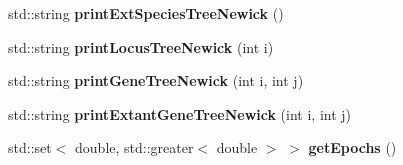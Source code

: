 \begin{DoxyCompactItemize}
std\+::string {\bfseries print\+Ext\+Species\+Tree\+Newick} ()
\item 
\mbox{\label{class_simulator_a97a59d13372af9e44e5a77ffb52f691f}} 
std\+::string {\bfseries print\+Locus\+Tree\+Newick} (int i)
\item 
\mbox{\label{class_simulator_a66f898c3509caa6fed6f2541b6f5e18d}} 
std\+::string {\bfseries print\+Gene\+Tree\+Newick} (int i, int j)
\item 
\mbox{\label{class_simulator_a2fec1961177cc3fc467c32758985c2b5}} 
std\+::string {\bfseries print\+Extant\+Gene\+Tree\+Newick} (int i, int j)
\item 
\mbox{\label{class_simulator_ad9fea6b4be6b5f88108b2ad84a016074}} 
std\+::set$<$ double, std\+::greater$<$ double $>$ $>$ {\bfseries get\+Epochs} ()
\end{DoxyCompactItemize}
